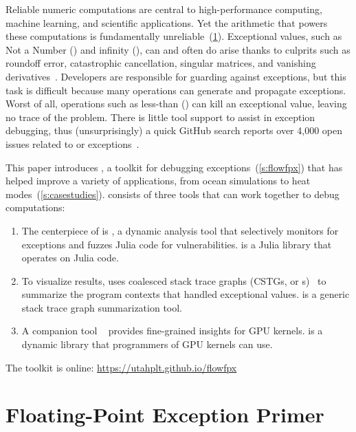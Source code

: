 \documentclass{juliacon}
\begin{document}
Reliable numeric computations are central to high-performance computing,
machine learning, and scientific applications.
Yet the \fp{} arithmetic that powers these computations is fundamentally
unreliable~(\cref{s:background}).
Exceptional values, such as Not a Number (\Nan{}) and infinity (\Inf{}),
can and often do arise thanks to culprits such as roundoff error,
catastrophic cancellation, singular matrices, and vanishing
derivatives~\cite{sdjmrstp-pc-2022,ddghlllprr-correctness-2022,gllprt-correctness-2021,fpchecker-reports,llg-soap-2022,bllmg-xloop-2022}.
Developers are responsible for guarding against exceptions, but this task
is difficult because many operations can generate and propagate exceptions.
Worst of all, operations such as less-than (\code{<}) can kill an exceptional value,
leaving no trace of the problem.
There is little tool support to assist in exception debugging,
thus (unsurprisingly) a quick GitHub search reports over 4,000 open issues
related to \NaN{} or \Inf{} exceptions~\cite{github-issues}.

This paper introduces \FlowFPX{}, a toolkit for debugging
\fp{} exceptions~(\cref{s:flowfpx})
that has helped improve a variety of applications,
from ocean simulations to heat modes~(\cref{s:casestudies}).
\FlowFPX{} consists of three tools that can work together to debug \fp{} computations:
\begin{enumerate}
  \item
    The centerpiece of \FlowFPX{} is \TF{}, a dynamic analysis tool that
    selectively monitors for exceptions and fuzzes Julia code for vulnerabilities.
    \TF{} is a Julia library that operates on Julia code.
  \item
    To visualize results, \FlowFPX{} uses coalesced stack trace graphs (CSTGs, or
    \CSTG{}s)~\cite{humphreySystematicDebuggingMethods2014}
    to summarize the program contexts that handled exceptional values.
    \CSTG{} is a generic stack trace graph summarization tool.
  \item
    A companion tool \GPUFPX{}~\cite{llsflg-hpdc-2023} provides fine-grained insights for GPU kernels.
    \GPUFPX{} is a dynamic library that programmers of GPU kernels can use.
\end{enumerate}

\noindent%
The toolkit is online: \url{https://utahplt.github.io/flowfpx}


\section{Floating-Point Exception Primer}
\label{s:background}
\end{document}
